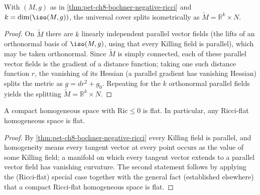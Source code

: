 \begin{corollary}[Corollary 8.2.4]
  \label{cor:pet-ch8-splitting-negative-ricci}
  With $(M,g)$ as in \cref{thm:pet-ch8-bochner-negative-ricci} and
  $k=\dim(\iso(M,g))$, the universal cover splits isometrically as
  $\widetilde M=\mathbb{R}^k\times N$.
\end{corollary}
\begin{proof}
  On $\widetilde M$ there are $k$ linearly independent parallel vector fields
  (the lifts of an orthonormal basis of $\iso(M,g)$, using that every Killing
  field is parallel), which may be taken orthonormal. Since $\widetilde M$ is
  simply connected, each of these parallel vector fields is the gradient of a
  distance function; taking one such distance function $r$, the vanishing of
  its Hessian (a parallel gradient has vanishing Hessian) splits the metric as
  $g=dr^2+g_0$. Repeating for the $k$ orthonormal parallel fields yields the
  splitting $\widetilde M=\mathbb{R}^k\times N$.
\end{proof}

\begin{corollary}[Corollary 8.2.5]
  \label{cor:pet-ch8-homogeneous-negative-ricci-flat}
  A compact homogeneous space with $\mathrm{Ric}\le0$ is flat. In particular,
  any Ricci-flat homogeneous space is flat.
\end{corollary}
\begin{proof}
  By \cref{thm:pet-ch8-bochner-negative-ricci} every Killing field is parallel,
  and homogeneity means every tangent vector at every point occurs as the value
  of some Killing field; a manifold on which every tangent vector extends to a
  parallel vector field has vanishing curvature. The second statement follows
  by applying the (Ricci-flat) special case together with the general fact
  (established elsewhere) that a compact Ricci-flat homogeneous space is flat.
\end{proof}

